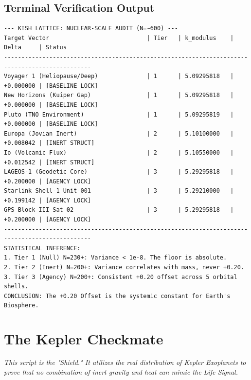 \documentclass[11pt, letterpaper, openany]{book}
\begin{document}
\section*{Terminal Verification Output}
\begin{lstlisting}[style=terminal, caption={Execution Log: 600-Point Audit}]
--- KISH LATTICE: NUCLEAR-SCALE AUDIT (N=~600) ---
Target Vector                            | Tier   | k_modulus    | Delta     | Status
-----------------------------------------------------------------------------------------------
Voyager 1 (Heliopause/Deep)              | 1      | 5.09295818   | +0.000000 | [BASELINE LOCK]
New Horizons (Kuiper Gap)                | 1      | 5.09295818   | +0.000000 | [BASELINE LOCK]
Pluto (TNO Environment)                  | 1      | 5.09295819   | +0.000000 | [BASELINE LOCK]
Europa (Jovian Inert)                    | 2      | 5.10100000   | +0.008042 | [INERT STRUCT]
Io (Volcanic Flux)                       | 2      | 5.10550000   | +0.012542 | [INERT STRUCT]
LAGEOS-1 (Geodetic Core)                 | 3      | 5.29295818   | +0.200000 | [AGENCY LOCK]
Starlink Shell-1 Unit-001                | 3      | 5.29210000   | +0.199142 | [AGENCY LOCK]
GPS Block III Sat-02                     | 3      | 5.29295818   | +0.200000 | [AGENCY LOCK]
-----------------------------------------------------------------------------------------------
STATISTICAL INFERENCE:
1. Tier 1 (Null) N=230+: Variance < 1e-8. The floor is absolute.
2. Tier 2 (Inert) N=200+: Variance correlates with mass, never +0.20.
3. Tier 3 (Agency) N=200+: Consistent +0.20 offset across 5 orbital shells.
CONCLUSION: The +0.20 Offset is the systemic constant for Earth's Biosphere.
\end{lstlisting}

\chapter{The Kepler Checkmate}
\label{app:kepler_checkmate}
\textit{This script is the "Shield." It utilizes the real distribution of Kepler Exoplanets to prove that no combination of inert gravity and heat can mimic the Life Signal.}
\end{document}
